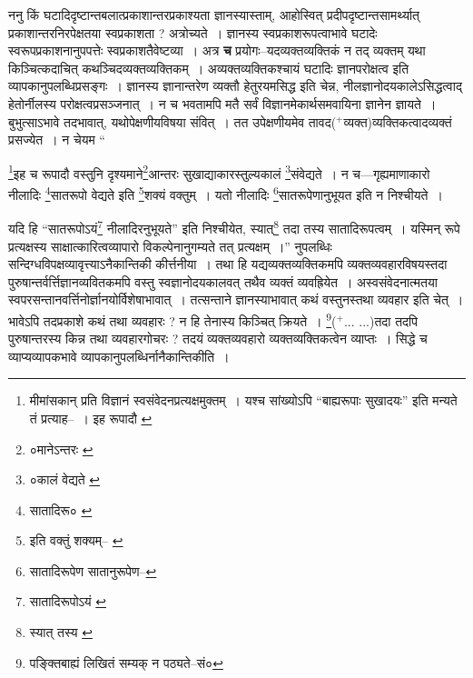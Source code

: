 \documentclass[article,12pt,a4paper]{memoir}
\newcommand{\add}[1]{($^{+}$#1)}
\begin{document}
	  \pstart ननु किं घटादिदृष्टान्तबलात्प्रकाशान्तरप्रकाश्यता ज्ञानस्यास्ताम्, आहोस्वित् प्रदीपदृष्टान्तसामर्थ्यात् प्रकाशान्तरनिरपेक्षतया स्वप्रकाशता ? अत्रोच्यते । ज्ञानस्य स्वप्रकाशरूपत्वाभावे घटादेः स्वरूपप्रकाशनानुपपत्तेः स्वप्रकाशतैवेष्टव्या । अत्र \textbf{च} प्रयोगः--यदव्यक्तव्यक्तिकं न तद् व्यक्तम् यथा किञ्चित्कदाचित् कथञ्चिदव्यक्तव्यक्तिकम् । अव्यक्तव्यक्तिकश्चायं घटादिः ज्ञानपरोक्षत्व इति व्यापकानुपलब्धिप्रसङ्गः । ज्ञानस्य ज्ञानान्तरेण व्यक्तौ हेतुरयमसिद्ध इति चेन्न, नीलज्ञानोदयकालेऽसिद्धत्वाद् हेतोर्नीलस्य परोक्षत्वप्रसञ्जनात् । न च भवतामपि मतै सर्वं विज्ञानमेकार्थसमवायिना ज्ञानेन ज्ञायते । बुभुत्साऽभावे तदभावात्, यथोपेक्षणीयविषया संवित् । तत उपेक्षणीयमेव तावद\add{व्यक्त}व्यक्तिकत्वादव्यक्तं प्रसज्येत । न चेयम  \leavevmode{} “
	  
	\footnote{मीमांसकान् प्रति विज्ञानं स्वसंवेदनप्रत्यक्षमुक्तम् । यश्च सांख्योऽपि “बाह्यरूपाः सुखादयः” इति मन्यते तं प्रत्याह--\cite{dp-msD-n} । इह रूपादौ \cite{dp-msD}}इह च रूपादौ वस्तुनि दृश्यमाने\footnote{०मानेऽन्तरः \cite{dp-msA} \cite{dp-msB} \cite{dp-msC} \cite{dp-msD} \cite{dp-edP} \cite{dp-edH} \cite{dp-edE}}आन्तरः सुखाद्याकारस्तुल्यकालं \footnote{०कालं वेद्यते \cite{dp-msC}}संवेद्यते । न च—गृह्यमाणाकारो नीलादिः \footnote{सातादिरू० \cite{dp-edP} \cite{dp-edH} \cite{dp-edE} \cite{dp-edN}}सातरूपो वेद्यते इति \footnote{इति वक्तुं शक्यम्--\cite{dp-msA} \cite{dp-edP} \cite{dp-edH} \cite{dp-edE}}शक्यं वक्तुम् । यतो नीलादिः \footnote{सातादिरूपेण \cite{dp-msA} \cite{dp-msC} \cite{dp-msD} \cite{dp-edP} \cite{dp-edH} \cite{dp-edE} \cite{dp-edN} सातानुरूपेण--\cite{dp-msB}}सातरूपेणानुभूयत इति न निश्चीयते । 
	  
	यदि हि “सातरूपोऽयं\footnote{सातादिरूपोऽयं \cite{dp-msA} \cite{dp-msC} \cite{dp-edP} \cite{dp-edE} \cite{dp-edN}} नीलादिरनुभूयते” इति निश्चीयेत, स्यात्\footnote{स्यात् तस्य \cite{dp-msA} \cite{dp-msC} \cite{dp-edP} \cite{dp-edE}} तदा तस्य सातादिरूपत्वम् । यस्मिन् रूपे प्रत्यक्षस्य साक्षात्कारित्वव्यापारो विकल्पेनानुगम्यते तत् प्रत्यक्षम् ।” नुपलब्धिः सन्दिग्धविपक्षव्यावृत्त्याऽनैकान्तिकी कीर्त्तनीया । \leavevmode{} तथा हि यद्यव्यक्तव्यक्तिकमपि व्यक्तव्यवहारविषयस्तदा पुरुषान्तर्वर्त्तिज्ञानव्यवितकमपि वस्तु स्वज्ञानोदयकालवत् तथैव व्यक्तं व्यवह्रियेत । अस्वसंवेदनात्मतया स्वपरसन्तानवर्त्तिनोर्ज्ञानयोर्विशेषाभावात् । तत्सन्ताने ज्ञानस्याभावात् कथं वस्तुनस्तथा व्यवहार इति चेत् । भावेऽपि तदप्रकाशे कथं तथा व्यवहारः ? न हि तेनास्य किञ्चित् क्रियते । \footnote{पङ्क्तिबाह्यं लिखितं सम्यक् न पठ्यते--सं०}\add{... ...}तदा तदपि पुरुषान्तरस्य किन्न तथा व्यवहारगोचरः ? तदयं व्यक्तव्यवहारो व्यक्तव्यक्तिकत्वेन व्याप्तः । सिद्धे च व्याप्यव्यापकभावे व्यापकानुपलब्धिर्नानैकान्तिकीति ।
	\pend
      
\end{document}

